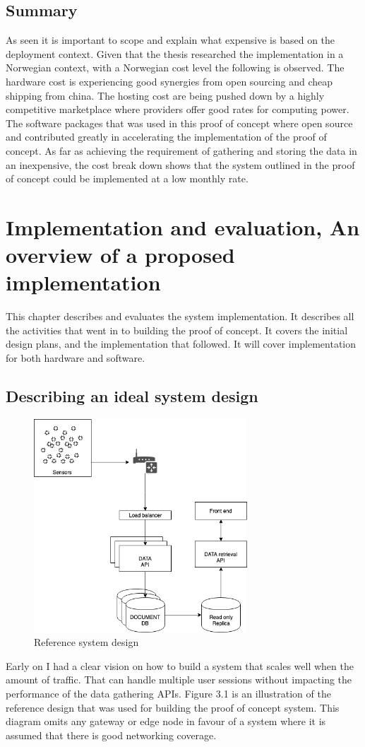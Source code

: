\documentclass[]{uiophd}
\begin{document}
\section{Summary}
As seen it is important to scope and explain what expensive is based on the deployment context. Given that the thesis researched the implementation in a Norwegian context, with a Norwegian cost level the following is observed. The hardware cost is experiencing good synergies from open sourcing and cheap shipping from china. The hosting cost are being pushed down by a highly competitive marketplace where providers offer good rates for computing power. The software packages that was used in this proof of concept where open source and contributed greatly in accelerating the implementation of the proof of concept. As far as achieving the requirement of gathering and storing the data in an inexpensive, the cost break down shows that the system outlined in the proof of concept could be implemented at a low monthly rate.


\chapter{Implementation and evaluation, An overview of a proposed implementation}

This chapter describes and evaluates the system implementation. It describes all the activities that went in to building the proof of concept. It covers the initial design plans, and the implementation that followed. It will cover implementation for both hardware and software.

\section{Describing an ideal system design}
\begin{figure}[h]
\caption{Reference system design}
\centering
\includegraphics[width=8cm]{ideal_system_design.png}

\end{figure}
Early on I had a clear vision on how to build a system that scales well when the amount of traffic. That can handle multiple user sessions without impacting the performance of the data gathering APIs. Figure 3.1 is an illustration of the reference design that was used for building the proof of concept system. This diagram omits any gateway or edge node in favour of a system where it is assumed that there is good networking coverage.
\\\\
\end{document}
